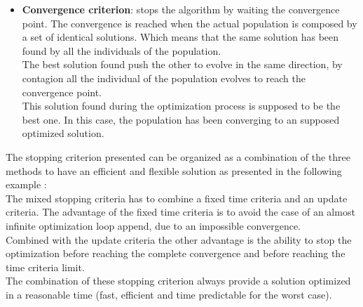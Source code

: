 \begin{itemize}
\item \textbf{Convergence criterion}: stops the algorithm by waiting the convergence point. The convergence is reached when the actual population is composed by a set of identical solutions. Which means that the same solution has been found by all the individuals of the population. \\
 The best solution found push the other to evolve in the same direction, by contagion all the individual of the population evolves to reach the convergence point. \\ 
 This solution found during the optimization process is supposed to be the best one. In this case, the population has been converging to an supposed optimized solution.%
\end{itemize}

 The stopping criterion presented can be organized as a combination of the three methods to have an efficient and flexible solution as presented in the following example :\\
The mixed stopping criteria has to combine a fixed time criteria and an update criteria.
The advantage of the fixed time criteria is to avoid the case of an almost infinite optimization loop append, due to an impossible convergence.%
\\ %
Combined with the update criteria the other advantage is the ability to stop the optimization before reaching the complete convergence and before reaching the time criteria limit.\\
The combination of these stopping criterion always provide a solution optimized in a reasonable time (fast, efficient and time predictable for the worst case). 

 
%



